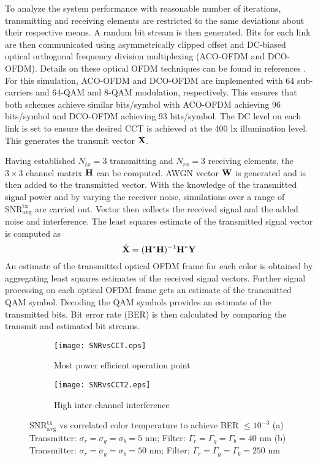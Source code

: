 To analyze the system performance with reasonable number of iterations, transmitting and receiving elements are restricted to the same deviations about their respective means. A random bit stream is then generated. Bits for each link are then communicated using asymmetrically clipped offset and DC-biased optical orthogonal frequency division multiplexing (ACO-OFDM and DCO-OFDM). Details on these optical OFDM techniques can be found in references \cite{car96a,arm06a}. For this simulation, ACO-OFDM and DCO-OFDM are implemented with 64 sub-carriers and 64-QAM and 8-QAM modulation, respectively. This ensures that both schemes achieve similar bits/symbol with ACO-OFDM achieving 96 bits/symbol and DCO-OFDM achieving 93 bits/symbol. The DC level on each link is set to ensure the desired CCT is achieved at the 400 lx illumination level. This generates the transmit vector ${\bf{X}}$. 

Having established $N_{tx} = 3$ transmitting and $N_{rx} = 3$ receiving elements, the $3\times 3$ channel matrix ${\bf{H}}$ can be computed. AWGN vector ${\bf{W}}$ is generated and is then added to the transmitted vector. With the knowledge of the transmitted signal power and by varying the receiver noise, simulations over a range of $\text{SNR}^{\text{tx}}_{\text{avg}}$ are carried out. Vector  then collects the received signal and the added noise and interference. The least squares estimate of the transmitted signal vector is computed as
\begin{equation}
	\label{eqXhat}
	\hat{{\bf{X}}} = ({\bf{H}}^{*}{\bf{H}})^{-1}{\bf{H}}^{*}{\bf{Y}}
\end{equation}
An estimate of the transmitted optical OFDM frame for each color is obtained by aggregating least squares estimates of the received signal vectors. Further signal processing on each optical OFDM frame gets an estimate of the transmitted QAM symbol. Decoding the QAM symbols provides an estimate of the transmitted bits. Bit error rate (BER) is then calculated by comparing the transmit and estimated bit streams.

\begin{figure}[t]
	\centering
		\begin{subfigure}{0.49\textwidth}
		\centering
			\texttt{[image: SNRvsCCT.eps]}
			\caption{Most power efficient operation point}
			\label{subfig:SNRvsCCThigh}
		\end{subfigure}
		\begin{subfigure}{0.49\textwidth}
		\centering
			\texttt{[image: SNRvsCCT2.eps]}
			\caption{High inter-channel interference}
			\label{subfig:SNRvsCCTlow}
		\end{subfigure}
	\caption{$\text{SNR}^{\text{tx}}_{\text{avg}}$ vs correlated color temperature to achieve BER $\leq 10^{-3}$ \newline(a) Transmitter: $\sigma_r = \sigma_g = \sigma_b = 5$ nm; Filter: $\Gamma_r = \Gamma_g = \Gamma_b = 40$ nm (b) Transmitter: $\sigma_r = \sigma_g = \sigma_b = 50$ nm; Filter: $\Gamma_r = \Gamma_g = \Gamma_b = 250$ nm}
\label{fig:SNRvsCCT}
\end{figure}

